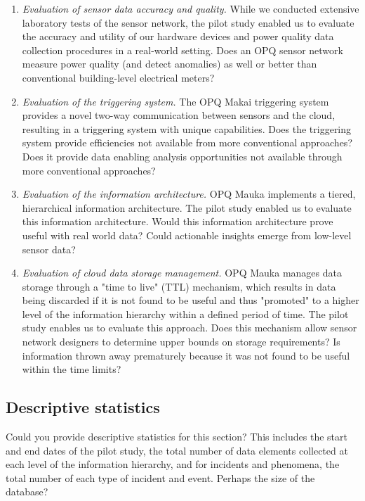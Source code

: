 \begin{enumerate}

\item {\em Evaluation of sensor data accuracy and quality.} While we conducted extensive laboratory tests of the sensor network, the pilot study enabled us to evaluate the accuracy and utility of our hardware devices and power quality data collection procedures in a real-world setting. Does an OPQ sensor network measure power quality (and detect anomalies) as well or better than conventional building-level electrical meters?

\item {\em Evaluation of the triggering system.} The OPQ Makai triggering system provides a novel two-way communication between sensors and the cloud, resulting in a triggering system with unique capabilities.  Does the triggering system provide efficiencies not available from more conventional approaches? Does it provide data enabling analysis opportunities not available through more conventional approaches?

\item {\em Evaluation of the information architecture.} OPQ Mauka implements a tiered, hierarchical information architecture.  The pilot study enabled us to evaluate this information architecture.  Would this information architecture prove useful with real world data? Could actionable insights emerge from low-level sensor data?

\item {\em Evaluation of cloud data storage management.} OPQ Mauka manages data storage through a "time to live" (TTL) mechanism, which results in data being discarded if it is not found to be useful and thus "promoted" to a higher level of the information hierarchy within a defined period of time.  The pilot study enables us to evaluate this approach. Does this mechanism allow sensor network designers to determine upper bounds on storage requirements? Is information thrown away prematurely because it was not found to be useful within the time limits?

\end{enumerate}

\subsection{Descriptive statistics}

\begin{tcolorbox}[colback=red!5!white,colframe=red!75!black,title=ANTHONY]

Could you provide descriptive statistics for this section? This includes the start and end dates of the pilot study, the total number of data elements collected at each level of the information hierarchy, and for incidents and phenomena, the total number of each type of incident and event. Perhaps the size of the database?
\end{tcolorbox}


